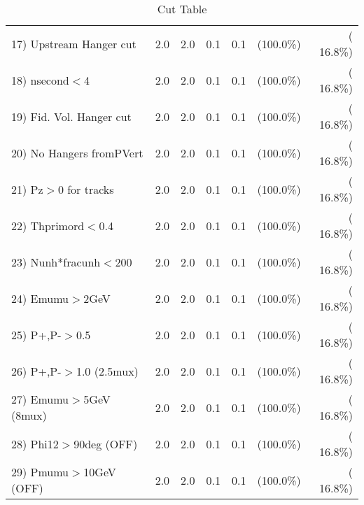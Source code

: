 \begin{table}[h!]
\begin{tabular}{||l||r|r|r|r|r|r||}
 17) Upstream Hanger cut  &          2.0 &          2.0 &          0.1 &          0.1 & (100.0\%) & ( 16.8\%) \\
 18) nsecond$<$4          &          2.0 &          2.0 &          0.1 &          0.1 & (100.0\%) & ( 16.8\%) \\
 19) Fid. Vol. Hanger cut &          2.0 &          2.0 &          0.1 &          0.1 & (100.0\%) & ( 16.8\%) \\
 20) No Hangers fromPVert &          2.0 &          2.0 &          0.1 &          0.1 & (100.0\%) & ( 16.8\%) \\
 21) Pz$>$0 for tracks    &          2.0 &          2.0 &          0.1 &          0.1 & (100.0\%) & ( 16.8\%) \\
 22) Thprimord$<$0.4      &          2.0 &          2.0 &          0.1 &          0.1 & (100.0\%) & ( 16.8\%) \\
 23) Nunh*fracunh$<$200   &          2.0 &          2.0 &          0.1 &          0.1 & (100.0\%) & ( 16.8\%) \\
 24) Emumu$>$2GeV         &          2.0 &          2.0 &          0.1 &          0.1 & (100.0\%) & ( 16.8\%) \\
 25) P+,P-$>$0.5          &          2.0 &          2.0 &          0.1 &          0.1 & (100.0\%) & ( 16.8\%) \\
 26) P+,P-$>$1.0 (2.5mux) &          2.0 &          2.0 &          0.1 &          0.1 & (100.0\%) & ( 16.8\%) \\
 27) Emumu$>$5GeV  (8mux) &          2.0 &          2.0 &          0.1 &          0.1 & (100.0\%) & ( 16.8\%) \\
 28) Phi12$>$90deg  (OFF) &          2.0 &          2.0 &          0.1 &          0.1 & (100.0\%) & ( 16.8\%) \\
 29) Pmumu$>$10GeV  (OFF) &          2.0 &          2.0 &          0.1 &          0.1 & (100.0\%) & ( 16.8\%) \\
 \hline
 \hline
 \end{tabular}
 \caption{Cut Table           }
 \label{tab-cutcohjpsi-mumu_cohrho0}
 \end{table}
